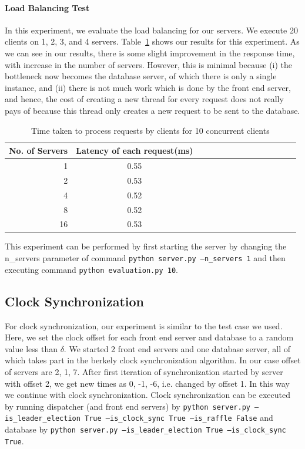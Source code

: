 \documentclass{article}
\begin{document}
\paragraph{Load Balancing Test} In this experiment,
we evaluate the load balancing for our servers. We execute 20 clients on
1, 2, 3, and 4 servers.
Table~\ref{tab:load-balancing} shows our results for this experiment.
As we can see in our results, there is some slight improvement in the response
time, with increase in the number of servers. However, this is minimal 
because (i) the bottleneck now becomes the database server, of which there is only
a single instance, and (ii) there is not much work which is done by the front
end server, and hence, the cost of creating a new thread for every request
does not really pays of because this thread only creates a new request to be sent to the 
database.
\begin{table}
    \small
\begin{tabularx}{\linewidth}{rccccccccccccc}
\toprule
No. of Servers &Latency of each request(ms)\\
\midrule
1&0.55\\
2&0.53\\
4&0.52\\
8&0.52\\
16&0.53\\
\bottomrule
\end{tabularx}
\caption{Time taken to process requests by clients for 10 concurrent clients}
\label{tab:load-balancing}
\end{table}

This experiment can be performed by first starting the server by changing
the n\_servers parameter of command {\tt python server.py --n\_servers 1} and then 
executing command {\tt python evaluation.py 10}.

\subsection{Clock Synchronization}
For clock synchronization, our experiment is similar to the test case we used.
Here, we set the clock offset for each front end server and database to a 
random value less than $\delta$. We started 2 front end servers and one 
database server, all of which takes part in the berkely clock synchronization
algorithm. In our case offset of servers are 2, 1, 7. After first iteration 
of synchronization started by server with offset 2, we get new times as
0, -1, -6, i.e. changed by offset 1. In this way we continue with 
clock synchronization. Clock synchronization can be executed by
running dispatcher (and front end servers) by {\tt python server.py --is\_leader\_election True --is\_clock\_sync True --is\_raffle False}
and database by {\tt python server.py --is\_leader\_election True --is\_clock\_sync True}.
\end{document}
